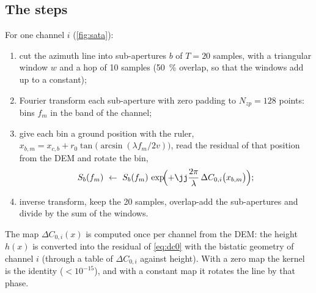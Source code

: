 \subsection{The steps}

For one channel $i$ (\cref{fig:sata}):
\begin{enumerate}
  \item cut the azimuth line into sub-apertures $b$ of $T=20$ samples, with a triangular window $w$ and a hop of 10 samples
        (\SI{50}{\percent} overlap, so that the windows add up to a constant);
  \item Fourier transform each sub-aperture with zero padding to $N_{zp}=128$ points: bins $f_m$ in the band of the channel;
  \item give each bin a ground position with the ruler, $x_{b,m}=x_{c,b}+r_0\tan\bigl(\arcsin(\lambda f_m/2v)\bigr)$,
        read the residual of that position from the DEM and rotate the bin,
        \begin{equation}
          S_b(f_m)\ \leftarrow\ S_b(f_m)\,\exp\!\Bigl(+\jj\frac{2\pi}{\lambda}\,\Delta C_{0,i}\bigl(x_{b,m}\bigr)\Bigr);
          \label{eq:satakernel}
        \end{equation}
  \item inverse transform, keep the 20 samples, overlap-add the sub-apertures and divide by the sum of the windows.
\end{enumerate}
The map $\Delta C_{0,i}(x)$ is computed once per channel from the DEM: the height $h(x)$ is converted into the residual of
\eqref{eq:dc0} with the bistatic geometry of channel $i$ (through a table of $\Delta C_{0,i}$ against height). With a zero map
the kernel is the identity ($<10^{-15}$), and with a constant map it rotates the line by that phase.

